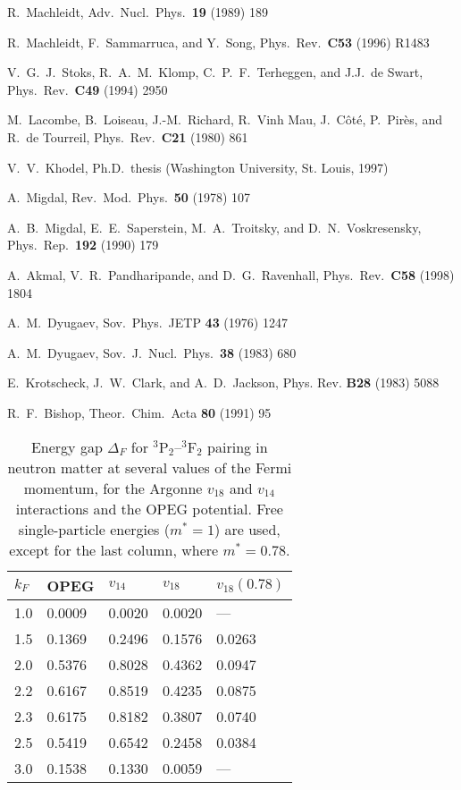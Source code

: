 \begin{thebibliography}{999}
R.~Machleidt, Adv.~Nucl.~Phys.\ {\bf 19} (1989) 189

 R.~Machleidt, F.~Sammarruca, and Y.~Song,
Phys.\ Rev.\ {\bf C53} (1996) R1483

  V.~G.~J.~Stoks, R.~A.~M.~Klomp, C.~P.~F.~Terheggen,
and J.J.~de Swart, Phys.\ Rev.\ {\bf C49} (1994) 2950

 M.~Lacombe, B.~Loiseau, J.-M.~Richard, R.~Vinh Mau,
J.~C\^ot\'e, P.~Pir\`es, and R.~de Tourreil, Phys.\ Rev.\ {\bf C21} (1980) 
861

V.~V.~Khodel, Ph.D.\ thesis (Washington University, St. Louis, 1997)

A.~Migdal, Rev.\ Mod.\ Phys.\ {\bf 50} (1978) 107

A.~B.~Migdal, E.~E.~Saperstein, M.~A.~Troitsky, and D.~N.~Voskresensky,
Phys.\ Rep.\ {\bf 192} (1990) 179

A.~Akmal, V.~R.~Pandharipande, and D.~G.~Ravenhall, Phys.\ Rev.\
{\bf C58} (1998) 1804 

A.~M.~Dyugaev, Sov.\ Phys.\ JETP {\bf 43} (1976) 1247

A.~M.~Dyugaev, Sov.\ J.\ Nucl.\ Phys.\ {\bf 38} (1983) 680

E.~Krotscheck, J.~W.~Clark, and A.~D.~Jackson, Phys. Rev. {\bf B28}
(1983) 5088

R.~F.~Bishop, Theor.\ Chim.\ Acta {\bf 80} (1991) 95
\end{thebibliography}
\newpage

\begin{table}
\caption{Energy gap $\Delta_F$ for $^3$P$_2$--$^3$F$_2$ pairing in
neutron matter at several values of the Fermi momentum, for the Argonne 
$v_{18}$ and $v_{14}$ interactions and the OPEG potential.  Free 
single-particle energies ($m^*=1$) are used, except for
the last column, where $m^*=0.78$.} 
\label{defparagcl} 
\begin{center}
\begin{tabular}{l l l l l}
\hline 
$ k_F $ &  OPEG  & $v_{14}$ & $v_{18}$ & $v_{18}(0.78)$ \\  
\hline 

1.0 &  0.0009 & 0.0020 & 0.0020 & --- \\
1.5 &  0.1369 & 0.2496 & 0.1576 & 0.0263 \\
2.0 &  0.5376 & 0.8028 & 0.4362 & 0.0947 \\
2.2 &  0.6167 & 0.8519 & 0.4235 & 0.0875 \\
2.3 &  0.6175 & 0.8182 & 0.3807 & 0.0740 \\
2.5 &  0.5419 & 0.6542 & 0.2458 & 0.0384 \\
3.0 &  0.1538 & 0.1330 & 0.0059 &  ---\\
\hline 
\end{tabular}
\end{center}
\end{table}

